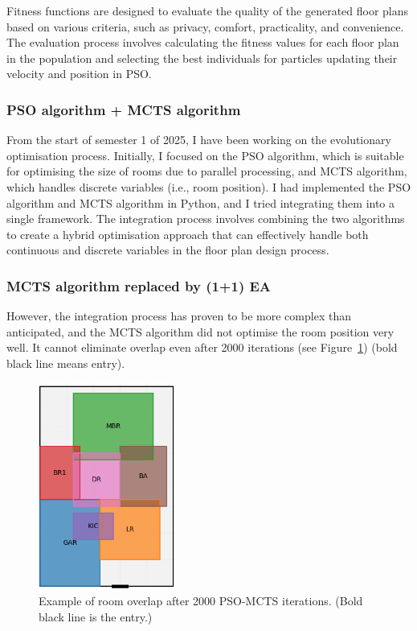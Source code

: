 \documentclass[]{article}
\begin{document}
Fitness functions are designed to evaluate the quality of the generated floor plans based on various criteria, such as privacy, comfort, practicality, and convenience. The evaluation process involves calculating the fitness values for each floor plan in the population and selecting the best individuals for particles updating their velocity and position in PSO.

\subsubsection{PSO algorithm + MCTS algorithm}
From the start of semester 1 of 2025, I have been working on the evolutionary optimisation process. Initially, I focused on the PSO algorithm, which is suitable for optimising the size of rooms due to parallel processing, and MCTS algorithm, which handles discrete variables (i.e., room position). I had implemented the PSO algorithm and MCTS algorithm in Python, and I tried integrating them into a single framework. The integration process involves combining the two algorithms to create a hybrid optimisation approach that can effectively handle both continuous and discrete variables in the floor plan design process.

\subsubsection{MCTS algorithm replaced by (1+1) EA}
However, the integration process has proven to be more complex than anticipated, and the MCTS algorithm did not optimise the room position very well. It cannot eliminate overlap even after 2000 iterations (see Figure~\ref{fig:mcts_overlap}) (bold black line means entry).

\begin{figure}[h]
    \centering
    \includegraphics[width=0.4\textwidth]{images/pso-mcts-1.png}
    \caption{Example of room overlap after 2000 PSO-MCTS iterations. (Bold black line is the entry.)}
    \label{fig:mcts_overlap}
\end{figure}
\end{document}
